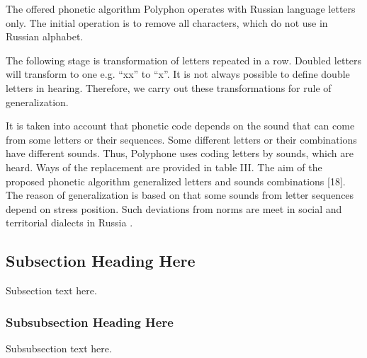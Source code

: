 \documentclass[conference,a4paper]{IEEEtran}
\begin{document}
The offered phonetic algorithm Polyphon operates with Russian language letters only. The initial operation is to remove all characters, which do not use in Russian alphabet. 

The following stage is transformation of letters repeated in a row. Doubled letters will transform to one e.g. “xx” to “x”. It is not always possible to define double letters in hearing. Therefore, we carry out these transformations for rule of generalization.

It is taken into account that phonetic code depends on the sound that can come from some letters or their sequences. Some different letters or their combinations have different sounds. Thus, Polyphone uses coding letters by sounds, which are heard. Ways of the replacement are provided in table III. The aim of the proposed phonetic algorithm generalized letters and sounds combinations [18]. The reason of generalization is based on that some sounds from letter sequences depend on stress position.  Such deviations from norms are meet in social and territorial dialects in Russia \cite{Zhirmunsky-1936}.


\subsection{Subsection Heading Here}
Subsection text here.


\subsubsection{Subsubsection Heading Here}
Subsubsection text here.
\end{document}
